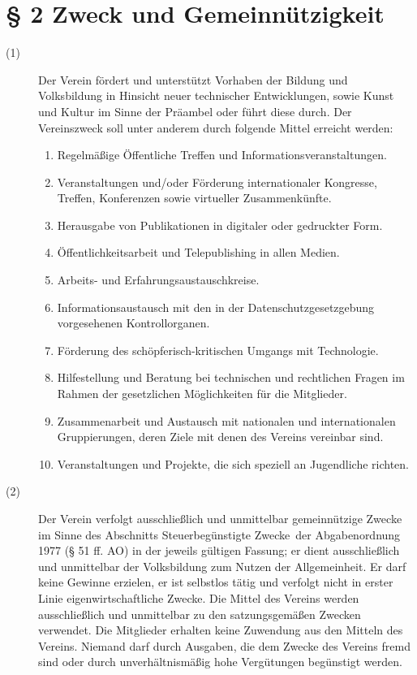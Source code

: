 \documentclass[12pt,paper=a4,ngerman]{scrreprt}
\begin{document}
\section{\S{} 2 Zweck und Gemeinnützigkeit}
\begin{description}
\item[(1)]
Der Verein fördert und unterstützt Vorhaben der Bildung und
Volksbildung in Hinsicht neuer technischer Entwicklungen, sowie Kunst
und Kultur im Sinne der Präambel oder führt diese durch. Der
Vereinszweck soll unter anderem durch folgende Mittel erreicht
werden:
\begin{enumerate}
\item
Regelmäßige Öffentliche Treffen und Informationsveranstaltungen.
\item
Veranstaltungen und/oder Förderung internationaler Kongresse, Treffen,
Konferenzen sowie virtueller Zusammenkünfte.
\item
Herausgabe von Publikationen in digitaler oder gedruckter Form.
\item
Öffentlichkeitsarbeit und Telepublishing in allen Medien.
\item
Arbeits- und Erfahrungsaustauschkreise.
\item
Informationsaustausch mit den in der Datenschutzgesetzgebung
vorgesehenen Kontrollorganen.
\item
Förderung des schöpferisch-kritischen Umgangs mit Technologie.
\item
Hilfestellung und Beratung bei technischen und rechtlichen Fragen im
Rahmen der gesetzlichen Möglichkeiten für die Mitglieder.
\item
Zusammenarbeit und Austausch mit nationalen und internationalen
Gruppierungen, deren Ziele mit denen des Vereins vereinbar sind.
\item
Veranstaltungen und Projekte, die sich speziell an Jugendliche richten.
\end{enumerate}
\item[(2)]
Der Verein verfolgt ausschließlich und unmittelbar gemeinnützige
Zwecke im Sinne des Abschnitts \glqq Steuerbegünstigte Zwecke\grqq\
der Abgabenordnung 1977 (§ 51 ff. AO) in der jeweils gültigen
Fassung; er dient ausschließlich und unmittelbar der Volksbildung zum
Nutzen der Allgemeinheit. Er darf keine Gewinne erzielen, er ist
selbstlos tätig und verfolgt nicht in erster Linie
eigenwirtschaftliche Zwecke. Die Mittel des Vereins werden
ausschließlich und unmittelbar zu den satzungsgemäßen Zwecken
verwendet. Die Mitglieder erhalten keine Zuwendung aus den Mitteln des
Vereins. Niemand darf durch Ausgaben, die dem Zwecke des Vereins fremd
sind oder durch unverhältnismäßig hohe Vergütungen begünstigt werden.
\end{description}
\end{document}
